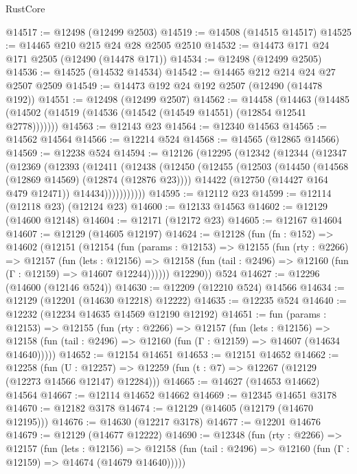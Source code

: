 \begin{lexlean}{RustCore}
\begin{coremodule}
@14517 := @12498 (@12499 @2503)
@14519 := @14508 (@14515 @14517)
@14525 := @14465 @210 @215 @24 @28 @2505 @2510
@14532 := @14473 @171 @24 @171 @2505 (@12490 (@14478 @171))
@14534 := @12498 (@12499 @2505)
@14536 := @14525 (@14532 @14534)
@14542 := @14465 @212 @214 @24 @27 @2507 @2509
@14549 := @14473 @192 @24 @192 @2507 (@12490 (@14478 @192))
@14551 := @12498 (@12499 @2507)
@14562 := @14458
    (@14463 (@14485 (@14502 (@14519 (@14536 (@14542 (@14549 @14551) (@12854 @12541 @2778)))))))
@14563 := @12143 @23
@14564 := @12340 @14563
@14565 := @14562 @14564
@14566 := @12214 @524
@14568 := @14565 (@12865 @14566)
@14569 := @12238 @524
@14594 := @12126
    (@12295
      (@12342
        (@12344
          (@12347
            (@12369
              (@12393
                (@12411
                  (@12438
                    (@12450
                      (@12455
                        (@12503
                          (@14450 (@14568 (@12869 @14569) (@12874 (@12876 @23))))
                          @14422
                          (@12750 (@14427 @164 @479 @12471))
                          @14434)))))))))))
@14595 := @12112 @23
@14599 := @12114 (@12118 @23) (@12124 @23)
@14600 := @12133 @14563
@14602 := @12129 (@14600 @12148)
@14604 := @12171 (@12172 @23)
@14605 := @12167 @14604
@14607 := @12129 (@14605 @12197)
@14624 := @12128
    (fun (fn : @152) =>
    @14602
      (@12151
        (@12154
          (fun (params : @12153) =>
          @12155
            (fun (rty : @2266) =>
            @12157
              (fun (lets : @12156) =>
              @12158 (fun (tail : @2496) => @12160 (fun (Γ : @12159) => @14607 @12244))))))
        @12290))
    @524
@14627 := @12296 (@14600 (@12146 @524))
@14630 := @12209 (@12210 @524) @14566
@14634 := @12129 (@12201 (@14630 @12218) @12222)
@14635 := @12235 @524
@14640 := @12232 (@12234 @14635 @14569 @12190 @12192)
@14651 := fun (params : @12153) =>
  @12155
    (fun (rty : @2266) =>
    @12157
      (fun (lets : @12156) =>
      @12158 (fun (tail : @2496) => @12160 (fun (Γ : @12159) => @14607 (@14634 @14640)))))
@14652 := @12154 @14651
@14653 := @12151 @14652
@14662 := @12258
    (fun (U : @12257) => @12259 (fun (t : @7) => @12267 (@12129 (@12273 @14566 @12147) @12284)))
@14665 := @14627 (@14653 @14662) @14564
@14667 := @12114 @14652 @14662
@14669 := @12345 @14651 @3178
@14670 := @12182 @3178
@14674 := @12129 (@14605 (@12179 (@14670 @12195)))
@14676 := @14630 (@12217 @3178)
@14677 := @12201 @14676
@14679 := @12129 (@14677 @12222)
@14690 := @12348
    (fun (rty : @2266) =>
    @12157
      (fun (lets : @12156) =>
      @12158 (fun (tail : @2496) => @12160 (fun (Γ : @12159) => @14674 (@14679 @14640)))))

\end{coremodule}
\end{lexlean}
